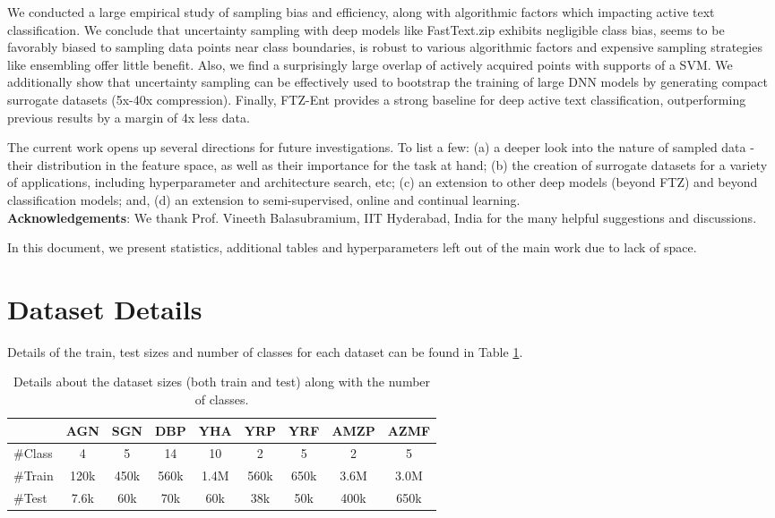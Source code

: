 \documentclass[11pt,a4paper]{article}
\begin{document}
We conducted a large empirical study of sampling bias and efficiency, along with algorithmic factors which impacting active text classification. We conclude that uncertainty sampling with deep models like FastText.zip exhibits negligible class bias, seems to be favorably biased to sampling data points near class boundaries, is robust to various algorithmic factors and expensive sampling strategies like ensembling offer little benefit. Also, we find a surprisingly large overlap of actively acquired points with supports of a SVM. We additionally show that uncertainty sampling can be effectively used to bootstrap the training of large DNN models by generating compact surrogate datasets (5x-40x compression). Finally, FTZ-Ent provides a strong baseline for deep active text classification, outperforming previous results by a margin of 4x less data.   

The current work opens up several directions for future investigations. To list a few: (a) a deeper look into the nature of sampled data - their distribution in the feature space, as well as their importance for the task at hand; (b) the creation of surrogate datasets for a variety of applications, including hyperparameter and architecture search, etc; (c) an extension to other deep models (beyond FTZ) and beyond classification models; and, (d) an extension to semi-supervised, online and continual learning.\\ 

\textbf{Acknowledgements}: We thank Prof. Vineeth Balasubramium, IIT Hyderabad, India for the many helpful suggestions and discussions. 
 \newpage


\clearpage
\appendix
In this document, we present statistics, additional tables and hyperparameters left out of the main work due to lack of space.

\section{Dataset Details}
Details of the train, test sizes and number of classes for each dataset can be found in Table \ref{tab:dataset_details}.
\begin{table}[t]
\centering
\small\addtolength{\tabcolsep}{-3pt}
\begin{tabular}{|l|c|c|c|c|c|c|c|c|}\hline
 & AGN & SGN & DBP & YHA & YRP & YRF & AMZP & AZMF \\ \hline
\#Class & 4 & 5 & 14 & 10 & 2 & 5 & 2 & 5 \\ \hline
\#Train& 120k & 450k & 560k & 1.4M & 560k & 650k & 3.6M & 3.0M\\ \hline
\#Test & 7.6k & 60k & 70k & 60k & 38k & 50k & 400k & 650k\\ \hline
\end{tabular}
\caption{Details about the dataset sizes (both train and test) along with the number of classes.}
\label{tab:dataset_details}
\end{table}
\end{document}
